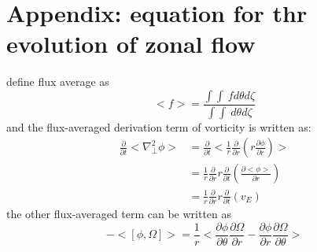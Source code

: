 \documentclass[11pt,a4paper]{article}
\begin{document}
%
%
%
%


\section{Appendix: equation for thr evolution of zonal flow}

	define flux average as 
	\begin{equation}
		<f>=\frac{\int\int\ fd\theta{d\zeta}}{\int\int\ d\theta{d\zeta}}
	\end{equation}
	and the flux-averaged derivation term of vorticity is written as:
	\begin{equation}
	\begin{aligned}
		\frac{\partial}{\partial{t}}<\nabla_\perp^2\phi>
		&=\frac{\partial}{\partial{t}}<\frac{1}{r}\frac{\partial}{\partial{r}}(r\frac{\partial{\phi}}{\partial{r}})>	\\
		&=\frac{1}{r}\frac{\partial}{\partial{r}}r\frac{\partial}{\partial{t}}(\frac{\partial<\phi>}{\partial{r}})	\\
		&=\frac{1}{r}\frac{\partial}{\partial{r}}r\frac{\partial}{\partial{t}}({v_E})
	\end{aligned}
	\end{equation}
	the other flux-averaged term can be written as
	\begin{equation}
		-<[\phi,\Omega]>
		=\frac{1}{r}<\frac{\partial\phi}{\partial\theta}\frac{\partial\Omega}{\partial{r}}-\frac{\partial\phi}{\partial{r}}\frac{\partial\Omega}{\partial\theta}>
	\end{equation}
\end{document}

